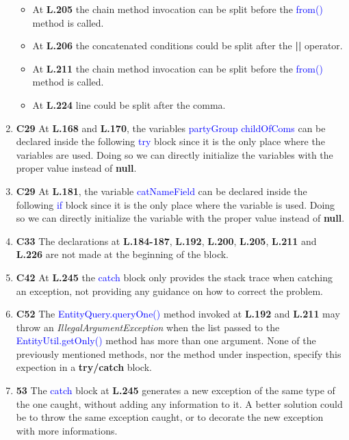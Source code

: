 \begin{enumerate}
\begin{itemize}
      \item At \textbf{L.205} the chain method invocation can be split before
        the \textcolor{blue}{from()} method is called.

      \item At \textbf{L.206} the concatenated conditions could be split after
        the \textbf{||} operator.

      \item At \textbf{L.211} the chain method invocation can be split before
        the \textcolor{blue}{from()} method is called.

      \item At \textbf{L.224} line could be split after the comma.

    \end{itemize}

  \item \textbf{C29} At \textbf{L.168} and \textbf{L.170}, the variables
    \textcolor{blue}{partyGroup} \textcolor{blue}{childOfComs} can be declared
    inside the following \textcolor{blue}{try} block since it is the only place
    where the variables are used. Doing so we can directly initialize the
    variables with the proper value instead of \textbf{null}.

  \item \textbf{C29} At \textbf{L.181}, the variable
    \textcolor{blue}{catNameField} can be declared inside the following
    \textcolor{blue}{if} block since it is the only place where the variable is
    used. Doing so we can directly initialize the variable with the proper value
    instead of \textbf{null}.

  \item \textbf{C33} The declarations at \textbf{L.184-187}, \textbf{L.192},
    \textbf{L.200}, \textbf{L.205}, \textbf{L.211} and \textbf{L.226} are not
    made at the beginning of the block.

  \item \textbf{C42} At \textbf{L.245} the \textcolor{blue}{catch} block only
    provides the stack trace when catching an exception, not providing any
    guidance on how to correct the problem.

  \item \textbf{C52} The \textcolor{blue}{EntityQuery.queryOne()} method invoked
    at \textbf{L.192} and \textbf{L.211} may throw an
    \textit{IllegalArgumentException} when the list passed to the
    \textcolor{blue}{EntityUtil.getOnly()} method has more than one argument.
    None of the previously mentioned methods, nor the method under inspection,
    specify this expection in a \textbf{try/catch} block.

  \item \textbf{53} The \textcolor{blue}{catch} block at \textbf{L.245}
    generates a new exception of the same type of the one caught, without
    adding any information to it. A better solution could be to throw the same
    exception caught, or to decorate the new exception with more informations.
\end{enumerate}
